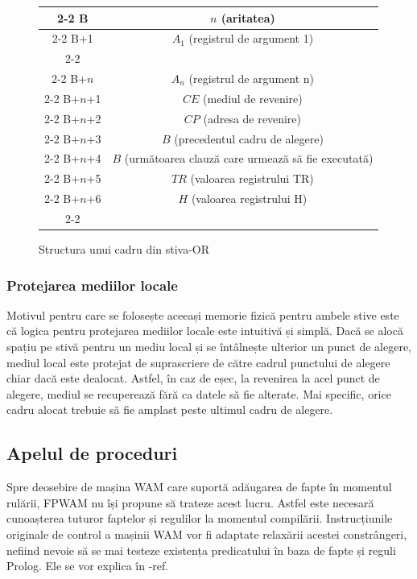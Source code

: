 \documentclass[12pt,a4paper,twoside]{report}
\begin{document}
\begin{figure}
\begin{center}
\begin{tabular}{c|c|}
\cline{2-2}
B & $n$ (aritatea) \\
\cline{2-2}
B+1 & $A_1$ (registrul de argument 1) \\
\cline{2-2}
\multicolumn{2}{c}{...} \\
\cline{2-2}
B+$n$ & $A_n$ (registrul de argument n) \\
\cline{2-2}
B+$n$+1 & $CE$ (mediul de revenire) \\
\cline{2-2}
B+$n$+2 & $CP$ (adresa de revenire) \\
\cline{2-2}
B+$n$+3 & $B$ (precedentul cadru de alegere) \\
\cline{2-2}
B+$n$+4 & $B$ (următoarea clauză care urmează să fie executată) \\
\cline{2-2}
B+$n$+5 & $TR$ (valoarea registrului TR) \\
\cline{2-2}
B+$n$+6 & $H$ (valoarea registrului H) \\
\cline{2-2}
\end{tabular}
\end{center}
\caption{Structura unui cadru din stiva-OR} \label{fig:stiva-or}
\end{figure}

\subsubsection{Protejarea mediilor locale}
Motivul pentru care se folosește aceeași memorie fizică pentru ambele stive este că logica pentru protejarea mediilor locale este intuitivă și simplă. Dacă se alocă spațiu pe stivă pentru un mediu local și se întâlnește ulterior un punct de alegere, mediul local este protejat de suprascriere de către cadrul punctului de alegere chiar dacă este dealocat. Astfel, în caz de eșec, la revenirea la acel punct de alegere, mediul se recuperează fără ca datele să fie alterate. Mai specific, orice cadru alocat trebuie să fie amplast peste ultimul cadru de alegere.

\subsection{Apelul de proceduri}
Spre deosebire de mașina WAM care suportă adăugarea de fapte în momentul rulării, FPWAM nu își propune să trateze acest lucru. Astfel este necesară cunoașterea tuturor faptelor și regulilor la momentul compilării. Instrucțiunile originale de control a mașinii WAM vor fi adaptate relaxării acestei constrângeri, nefiind nevoie să se mai testeze existența predicatului în baza de fapte și reguli Prolog. Ele se vor explica în -ref.
\end{document}
